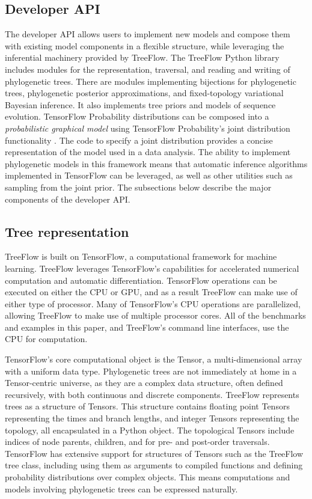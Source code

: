 \documentclass[oupdraft]{sysbio_sse}
\let\cite\citep
\begin{document}
\subsection{Developer API}

The developer API allows users to implement new models and compose them with existing model components in a flexible structure, while leveraging the inferential machinery provided by TreeFlow. The TreeFlow Python library includes modules for the representation, traversal, and reading and writing of phylogenetic trees. There are modules implementing bijections for phylogenetic trees, phylogenetic posterior approximations, and fixed-topology variational Bayesian inference. It also implements tree priors and models of sequence evolution. TensorFlow Probability distributions can be composed into a \textit{probabilistic graphical model} using TensorFlow Probability's joint distribution functionality \cite{piponi2020joint}. The code to specify a joint distribution provides a concise representation of the model used in a data analysis. The ability to implement phylogenetic models in this framework means that automatic inference algorithms implemented in TensorFlow can be leveraged, as well as other utilities such as sampling from the joint prior. The subsections below describe the major components of the developer API.

\subsection{Tree representation}

TreeFlow is built on TensorFlow, a computational framework for machine learning. TreeFlow leverages TensorFlow's capabilities for accelerated numerical computation and automatic differentiation. TensorFlow operations can be executed on either the CPU or GPU, and as a result TreeFlow can make use of either type of processor. Many of TensorFlow's CPU operations are parallelized, allowing TreeFlow to make use of multiple processor cores. All of the benchmarks and examples in this paper, and TreeFlow's command line interfaces, use the CPU for computation.

TensorFlow's core computational object is the Tensor, a multi-dimensional array with a uniform data type. Phylogenetic trees are not immediately at home in a Tensor-centric universe, as they are a complex data structure, often defined recursively, with both continuous and discrete components. TreeFlow represents trees as a structure of Tensors. This structure contains floating point Tensors representing the times and branch lengths, and integer Tensors representing the topology, all encapsulated in a Python object. The topological Tensors include indices of node parents, children, and for pre- and post-order traversals. TensorFlow has extensive support for structures of Tensors such as the TreeFlow tree class, including using them as arguments to compiled functions and defining probability distributions over complex objects. This means computations and models involving phylogenetic trees can be expressed naturally.
\end{document}
